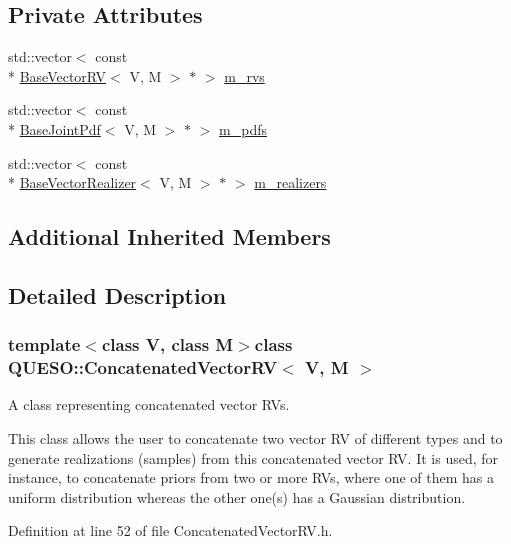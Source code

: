 \subsection*{Private Attributes}
\begin{DoxyCompactItemize}
\item 
std\-::vector$<$ const \\*
\hyperlink{class_q_u_e_s_o_1_1_base_vector_r_v}{Base\-Vector\-R\-V}$<$ V, M $>$ $\ast$ $>$ \hyperlink{class_q_u_e_s_o_1_1_concatenated_vector_r_v_a5b69ebda44adae11e7d45987dac4b0a6}{m\-\_\-rvs}
\item 
std\-::vector$<$ const \\*
\hyperlink{class_q_u_e_s_o_1_1_base_joint_pdf}{Base\-Joint\-Pdf}$<$ V, M $>$ $\ast$ $>$ \hyperlink{class_q_u_e_s_o_1_1_concatenated_vector_r_v_afbe85f9e6091d0086511d911929c2348}{m\-\_\-pdfs}
\item 
std\-::vector$<$ const \\*
\hyperlink{class_q_u_e_s_o_1_1_base_vector_realizer}{Base\-Vector\-Realizer}$<$ V, M $>$ $\ast$ $>$ \hyperlink{class_q_u_e_s_o_1_1_concatenated_vector_r_v_af5481dcec21a16d9b3d00a35d161d34f}{m\-\_\-realizers}
\end{DoxyCompactItemize}
\subsection*{Additional Inherited Members}


\subsection{Detailed Description}
\subsubsection*{template$<$class V, class M$>$class Q\-U\-E\-S\-O\-::\-Concatenated\-Vector\-R\-V$<$ V, M $>$}

A class representing concatenated vector R\-Vs. 

This class allows the user to concatenate two vector R\-V of different types and to generate realizations (samples) from this concatenated vector R\-V. It is used, for instance, to concatenate priors from two or more R\-Vs, where one of them has a uniform distribution whereas the other one(s) has a Gaussian distribution. 

Definition at line 52 of file Concatenated\-Vector\-R\-V.\-h.



